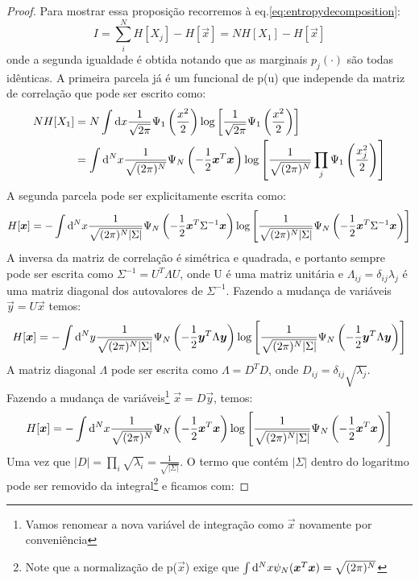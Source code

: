 \begin{proof}
Para mostrar essa proposição recorremos à eq.\eqref{eq:entropydecomposition}:
\begin{equation*}
I = \sum_{i}^{N}H[X_j] - H[\vec{x}] = N H[X_1] - H[\vec{x}]
\end{equation*}
onde a segunda igualdade é obtida notando que as marginais $p_j(\cdot)$ são todas idênticas. A primeira parcela já é um funcional de p(u) que independe da matriz de correlação que pode ser escrito como: 
\begin{align*}
N H[X_1] &= N\int \mathrm{d} x \frac{1}{\sqrt{2\pi}} \Psi_{1}\left(\frac{x^2}{2}\right) \log\left[\frac{1}{\sqrt{2\pi}} \Psi_{1}\left(\frac{x^2}{2}\right)\right] \\
	 &= \int \mathrm{d}^N x \frac{1}{\sqrt{(2\pi)^N}} \Psi_{N}\left(-\frac{1}{2} \bm{x}^{T}\bm{x}\right) \log\left[\frac{1}{\sqrt{(2\pi)^N}}\prod_j \Psi_{1}\left(\frac{x_j^2}{2}\right)\right]
\end{align*}
A segunda parcela pode ser explicitamente escrita como:
\begin{equation*}
 H[\bm{x}] = - \int \mathrm{d}^N x \frac{1}{\sqrt{(2\pi)^N |\Sigma|}} \Psi_{N}\left(-\frac{1}{2} \bm{x}^{T}\Sigma^{-1}\bm{x}\right) \log\left[\frac{1}{\sqrt{(2\pi)^N |\Sigma|}} \Psi_{N}\left(-\frac{1}{2} \bm{x}^{T}\Sigma^{-1}\bm{x}\right)\right]
\end{equation*}
A inversa da matriz de correlação é simétrica e quadrada, e portanto sempre pode ser escrita como $\Sigma^{-1} = U^{T} \Lambda U$, onde U é uma matriz unitária e $\Lambda_{ij} = \delta_{ij}\lambda_j$ é uma matriz diagonal dos autovalores de $\Sigma^{-1}$. Fazendo a mudança de variáveis $\vec{y} = U\vec{x}$ temos:
\[
H[\bm{x}] = - \int \mathrm{d}^N y \frac{1}{\sqrt{(2\pi)^N |\Sigma|}} \Psi_{N}\left(-\frac{1}{2} \bm{y}^{T}\Lambda\bm{y}\right) \log\left[\frac{1}{\sqrt{(2\pi)^N |\Sigma|}} \Psi_{N}\left(-\frac{1}{2} \bm{y}^{T}\Lambda\bm{y}\right)\right]
\]
A matriz diagonal $\Lambda$ pode ser escrita como $\Lambda = D^{T} D$, onde $D_{ij} = \delta_{ij}\sqrt{\lambda_j}$. Fazendo a mudança de variáveis\footnote{Vamos renomear a nova variável de integração como $\vec{x}$ novamente por conveniência} $\vec{x}= D\vec{y}$, temos:
\begin{equation*}
 H[\bm{x}] = - \int \mathrm{d}^N x \frac{1}{\sqrt{(2\pi)^N}} \Psi_{N}\left(-\frac{1}{2} \bm{x}^{T}\bm{x}\right) \log\left[\frac{1}{\sqrt{(2\pi)^N |\Sigma|}} \Psi_{N}\left(-\frac{1}{2} \bm{x}^{T}\bm{x}\right)\right]
\end{equation*}
Uma vez que $|D| = \prod_{i} \sqrt{\lambda_i} = \frac{1}{\sqrt{|\Sigma|}}$. O termo que contém $|\Sigma|$ dentro do logaritmo pode ser removido da integral\footnote{Note que a normalização de p($\vec{x}$) exige que $\int \mathrm{d}^N x \psi_{N}(\bm{x}^{T}\bm{x}) = \sqrt{(2\pi)^N}$} e ficamos com:

\end{proof}
